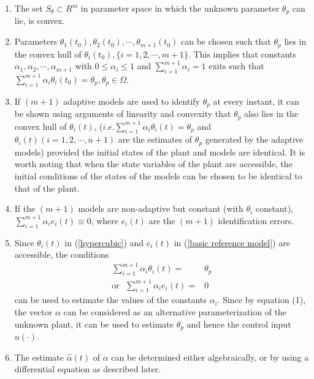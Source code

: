 \documentclass[conference]{IEEEtran}
\begin{document}
\begin{enumerate}
\item The set $S_{\theta}\subset R^{m}$ in parameter space in which the unknown parameter $\theta_{p}$ can lie, is convex.
\item Parameters $\theta_{1}(t_{0}), \theta_{2}(t_{0}),\cdots, \theta_{m+1}(t_{0})$ can be chosen such that $\theta_{p}$  lies in the convex hull of $\theta_{i}(t_{0}),\{i=1,2,\cdots,m+1\}$. This implies that constants $\alpha_{1},\alpha_{2},\cdots,\alpha_{m+1}$ with $0\leq \alpha_{i}\leq 1$ and $\sum_{i=1}^{m+1}\alpha_{i}=1$ exits such that $\sum_{i=1}^{m+1}\alpha_{i}\theta_{i}(t_{0})=\theta_{p}, \theta_{p}\in\Omega$.
\item If $(m+1)$ adaptive models are used to identify $\theta_{p}$ at every instant, it can be shown using arguments of linearity and convexity that $\theta_{p}$ also lies in the convex  hull of $\theta_{i}(t)$, ($i.e. \sum_{i=1}^{m+1}\alpha_{i}\theta_{i}(t)=\theta_{p}$ and $\theta_{i}(t) (i=1,2,\cdots,n+1)$ are the estimates of $\theta_{p}$ generated by the adaptive models) provided the initial states of the plant and models are identical. It is worth noting that when the state variables of the plant are accessible, the initial conditions of the states of the models can be chosen to be identical to that of the plant.
\item If the $(m+1)$ models are non-adaptive but constant (with $\theta_{i}$ constant), $ \sum_{i=1}^{m+1}\alpha_{i}e_{i}(t)\equiv0$, where $e_{i}(t)$ are the $(m+1)$ identification errors.
\item Since $\theta_{i}(t)$ in (\ref{hypercubic}) and $e_{i}(t)$ in (\ref{basic reference model}) are accessible, the conditions
\begin{equation}
\begin{split}
\sum_{i=1}^{m+1}\alpha_{i}\theta_{i}(t)=&\theta_{p}\\
\text{or}\ \ \ \sum_{i=1}^{m+1}\alpha_{i}e_{i}(t)=&0
\end{split}
\end{equation}
can be used to estimate the values of the constants $\alpha_{i}$. Since by equation (1), the vector $\alpha$ can be considered as an alternative parameterization of the unknown plant, it can be used to estimate $\theta_{p}$ and hence the control input $u(\cdot)$.
\item The estimate $\hat{\alpha}(t)$ of $\alpha$ can be determined either algebraically, or by using a differential equation as described later.
\end{enumerate}
\end{document}
